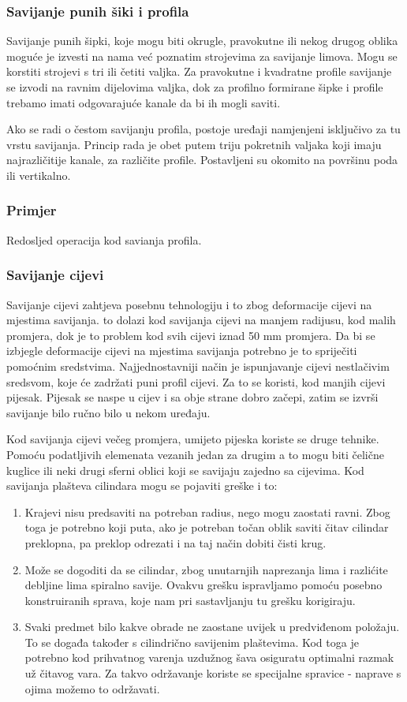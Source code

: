 \documentclass[a4paper,12pt]{article}
\numberwithin{figure}{section}
\begin{document}
\subsubsection{Savijanje punih šiki i profila}
Savijanje punih šipki, koje mogu biti okrugle, pravokutne ili nekog drugog oblika moguće je izvesti na nama već poznatim strojevima za savijanje limova. Mogu se korstiti strojevi s tri ili četiti valjka. Za pravokutne i kvadratne profile savijanje se izvodi na ravnim dijelovima valjka, dok za profilno formirane šipke i profile trebamo imati odgovarajuće kanale da bi ih mogli saviti.\par
Ako se radi o čestom savijanju profila, postoje uređaji namjenjeni isključivo za tu vrstu savijanja. Princip rada je obet putem triju pokretnih valjaka koji imaju najrazličitije kanale, za različite profile. Postavljeni su okomito na površinu poda ili vertikalno.
\subsubsection*{Primjer}
Redosljed operacija kod savianja profila.
\subsubsection{Savijanje cijevi}
Savijanje cijevi zahtjeva posebnu tehnologiju i to zbog deformacije cijevi na mjestima savijanja. to dolazi kod savijanja cijevi na manjem radijusu, kod malih promjera, dok je to problem kod svih cijevi iznad 50 mm promjera. Da bi se izbjegle deformacije cijevi na mjestima savijanja potrebno je to spriječiti pomoćnim sredstvima. Najjednostavniji način je ispunjavanje cijevi nestlačivim sredsvom, koje će zadržati puni profil cijevi. Za to se koristi, kod manjih cijevi pijesak. Pijesak se naspe u cijev i sa obje strane dobro začepi, zatim se izvrši savijanje bilo ručno bilo u nekom uređaju. \par
Kod savijanja cijevi večeg promjera, umijeto pijeska koriste se druge tehnike.
Pomoću podatljivih elemenata vezanih jedan za drugim a to mogu biti čelične kuglice ili neki drugi sferni oblici koji se savijaju zajedno sa cijevima. Kod savijanja plašteva cilindara mogu se pojaviti greške i to:
\begin{enumerate}
\item Krajevi nisu predsaviti na potreban radius, nego mogu zaostati ravni. Zbog toga je potrebno koji puta, ako je potreban točan oblik saviti čitav cilindar preklopna, pa preklop odrezati i na taj način dobiti čisti krug.
\item Može se dogoditi da se cilindar, zbog unutarnjih naprezanja lima i razlićite debljine lima spiralno savije. Ovakvu grešku ispravljamo pomoću posebno konstruiranih sprava, koje nam pri sastavljanju tu grešku korigiraju.
\item Svaki predmet bilo kakve obrade ne zaostane uvijek u predviđenom položaju. To se događa također s cilindrično savijenim plaštevima. Kod toga je potrebno kod prihvatnog varenja uzdužnog šava osiguratu optimalni razmak už čitavog vara. Za takvo održavanje koriste se specijalne spravice - naprave s ojima možemo to  održavati.
\end{enumerate}
\end{document}
